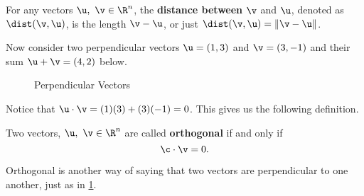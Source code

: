 \begin{definition}
  \label{def:distance_between_vectors}

  For any vectors $\u,~\v \in \R^n$, the \textbf{distance between} $\v$ and
  $\u$, denoted as $\dist(\v, \u)$, is the length $\v - \u$, or just $\dist(\v,
  \u) = \Vert \v - \u \Vert$.
\end{definition}

Now consider two perpendicular vectors $\u = (1, 3)$ and $\v = (3, -1)$ and
their sum $\u + \v = (4, 2)$ below.
\begin{figure}[H]
  \centering


  \caption{Perpendicular Vectors}
  \label{fig:perpendicular_vectors}
\end{figure}

Notice that $\u \cdot \v = (1)(3) + (3)(-1) = 0$. This gives us the following definition.

\begin{definition}[Orthogonal]
  \label{def:orthogonal}

  Two vectors, $\u,~\v \in \R^n$ are called \textbf{orthogonal} if and only if
  \[%
    \c \cdot \v = 0
  .\]%
\end{definition}

\begin{note}
  \label{nte:orthogonal}

  Orthogonal is another way of saying that two vectors are perpendicular to one
  another, just as in \cref{fig:perpendicular_vectors}.
\end{note}


